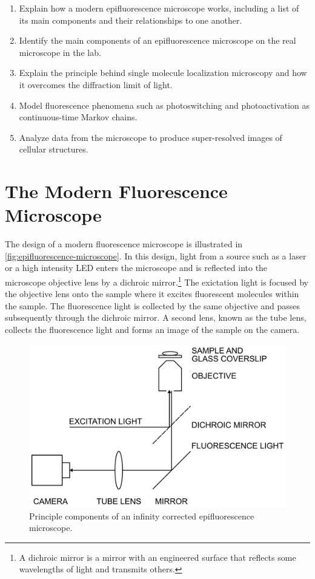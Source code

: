 \documentclass[10pt,a4paper]{book}
\begin{document}
\begin{enumerate}
    \item Explain how a modern epifluorescence microscope works, including a list of its main components and their relationships to one another.
    \item Identify the main components of an epifluorescence microscope on the real microscope in the lab.
    \item Explain the principle behind single molecule localization microscopy and how it overcomes the diffraction limit of light.
    \item Model fluorescence phenomena such as photoswitching and photoactivation as continuous-time Markov chains.
    \item Analyze data from the microscope to produce super-resolved images of cellular structures.
\end{enumerate}

\chapter{The Modern Fluorescence Microscope}

The design of a modern fluorescence microscope is illustrated in \autoref{fig:epifluorescence-microscope}. In this design, light from a source such as a laser or a high intensity LED enters the microscope and is reflected into the microscope objective lens by a dichroic mirror.\footnote{A dichroic mirror is a mirror with an engineered surface that reflects some wavelengths of light and transmits others.} The exictation light is focused by the objective lens onto the sample where it excites fluorescent molecules within the sample. The fluorescence light is collected by the same objective and passes subsequently through the dichroic mirror. A second lens, known as the tube lens, collects the fluorescence light and forms an image of the sample on the camera.

\begin{figure}[ht]
    \centering
    \includegraphics{epifluorescence-microscope.png}
    \caption{Principle components of an infinity corrected epifluorescence microscope.}
    \label{fig:epifluorescence-microscope}
\end{figure}
\end{document}
